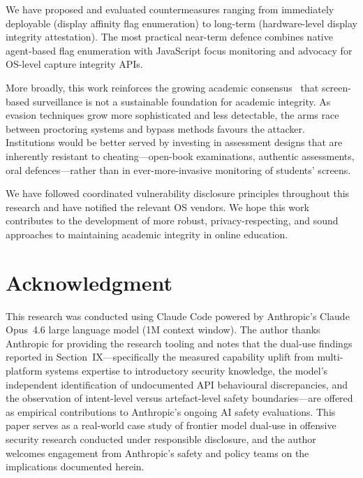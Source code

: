 \documentclass[conference]{IEEEtran}
\begin{document}
We have proposed and evaluated countermeasures ranging from immediately deployable (display affinity flag enumeration) to long-term (hardware-level display integrity attestation). The most practical near-term defence combines native agent-based flag enumeration with JavaScript focus monitoring and advocacy for OS-level capture integrity APIs.

More broadly, this work reinforces the growing academic consensus~\cite{lee2022online,khalil2022nexus,duncan2022necessity,paris2021sins} that screen-based surveillance is not a sustainable foundation for academic integrity. As evasion techniques grow more sophisticated and less detectable, the arms race between proctoring systems and bypass methods favours the attacker. Institutions would be better served by investing in assessment designs that are inherently resistant to cheating---open-book examinations, authentic assessments, oral defences---rather than in ever-more-invasive monitoring of students' screens.

We have followed coordinated vulnerability disclosure principles throughout this research and have notified the relevant OS vendors. We hope this work contributes to the development of more robust, privacy-respecting, and sound approaches to maintaining academic integrity in online education.

\section*{Acknowledgment}

This research was conducted using Claude Code powered by Anthropic's Claude Opus~4.6 large language model (1M context window). The author thanks Anthropic for providing the research tooling and notes that the dual-use findings reported in Section~IX---specifically the measured capability uplift from multi-platform systems expertise to introductory security knowledge, the model's independent identification of undocumented API behavioural discrepancies, and the observation of intent-level versus artefact-level safety boundaries---are offered as empirical contributions to Anthropic's ongoing AI safety evaluations. This paper serves as a real-world case study of frontier model dual-use in offensive security research conducted under responsible disclosure, and the author welcomes engagement from Anthropic's safety and policy teams on the implications documented herein.

{\sloppy


}
\end{document}
